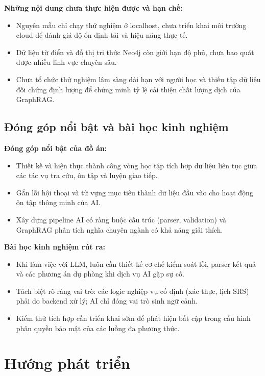 \documentclass[../DoAn.tex]{subfiles}
\begin{document}
\textbf{Những nội dung chưa thực hiện được và hạn chế:}
\begin{itemize}[itemsep=0pt,parsep=0pt,topsep=2pt,partopsep=0pt]
    \item Nguyên mẫu chỉ chạy thử nghiệm ở localhost, chưa triển khai môi trường cloud để đánh giá độ ổn định tải và hiệu năng thực tế.
    \item Dữ liệu từ điển và đồ thị tri thức Neo4j còn giới hạn độ phủ, chưa bao quát được nhiều lĩnh vực chuyên sâu.
    \item Chưa tổ chức thử nghiệm lâm sàng dài hạn với người học và thiếu tập dữ liệu đối chứng định lượng để chứng minh tỷ lệ cải thiện chất lượng dịch của GraphRAG.
\end{itemize}

\subsection{Đóng góp nổi bật và bài học kinh nghiệm}

\textbf{Đóng góp nổi bật của đồ án:}
\begin{itemize}[itemsep=0pt,parsep=0pt,topsep=2pt,partopsep=0pt]
    \item Thiết kế và hiện thực thành công vòng học tập tích hợp dữ liệu liên tục giữa các tác vụ tra cứu, ôn tập và luyện giao tiếp.
    \item Gắn lỗi hội thoại và từ vựng mục tiêu thành dữ liệu đầu vào cho hoạt động ôn tập thông minh của AI.
    \item Xây dựng pipeline AI có ràng buộc cấu trúc (parser, validation) và GraphRAG phân tích nghĩa chuyên ngành có khả năng giải thích.
\end{itemize}

\textbf{Bài học kinh nghiệm rút ra:}
\begin{itemize}[itemsep=0pt,parsep=0pt,topsep=2pt,partopsep=0pt]
    \item Khi làm việc với LLM, luôn cần thiết kế cơ chế kiểm soát lỗi, parser kết quả và các phương án dự phòng khi dịch vụ AI gặp sự cố.
    \item Tách biệt rõ ràng vai trò: các logic nghiệp vụ cố định (xác thực, lịch SRS) phải do backend xử lý; AI chỉ đóng vai trò sinh ngữ cảnh.
    \item Kiểm thử tích hợp cần triển khai sớm để phát hiện bất cập trong cấu hình phân quyền bảo mật của các luồng đa phương thức.
\end{itemize}

\section{Hướng phát triển}
\label{section:6.2}
\end{document}
